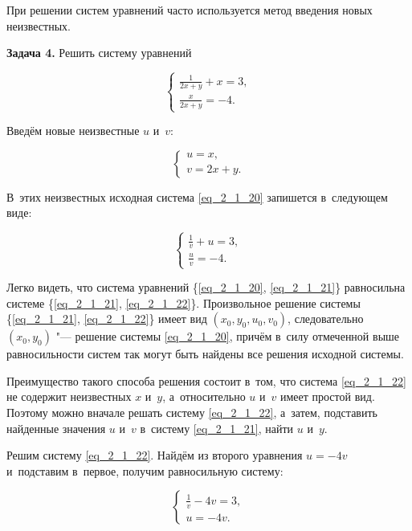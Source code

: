 При решении систем уравнений часто используется метод введения новых неизвестных.

\textbf{Задача 4.}
Решить систему уравнений

\begin{equation}\label{eq_2_1_20}
\begin{cases}
\displaystyle \frac{1}{2x + y} + x = 3, \\[10pt]
\displaystyle \frac{x}{2x + y} = -4.
\end{cases}
\end{equation} 

Введём новые неизвестные $u$ и~$v$:

\begin{equation}\label{eq_2_1_21}
\begin{cases}
u = x, \\
v = 2x + y.
\end{cases}
\end{equation}

В~этих неизвестных исходная система \eqref{eq_2_1_20} запишется в~следующем виде:

\begin{equation}\label{eq_2_1_22}
\begin{cases}
\displaystyle \frac{1}{v} + u = 3, \\[10pt]
\displaystyle \frac{u}{v} = -4.
\end{cases}
\end{equation}

Легко видеть, что система уравнений \{\eqref{eq_2_1_20}, \eqref{eq_2_1_21}\}
равносильна системе \{\eqref{eq_2_1_21}, \eqref{eq_2_1_22}\}.
Произвольное решение системы \{\eqref{eq_2_1_21}, \eqref{eq_2_1_22}\}
имеет вид $(x_{0}, y_{0}, u_{0}, v_{0})$, следовательно
$(x_{0}, y_{0})$ "--- решение системы \eqref{eq_2_1_20}, причём в~силу отмеченной
выше равносильности систем так могут быть найдены все решения исходной системы.

Преимущество такого способа решения состоит в~том, что система \eqref{eq_2_1_22}
не содержит неизвестных $x$ и~$y$, а~относительно $u$ и~$v$ имеет простой вид.
Поэтому можно вначале решать систему \eqref{eq_2_1_22}, а~затем, подставить
найденные значения $u$ и~$v$ в~систему \eqref{eq_2_1_21}, найти $u$ и~$y$.

Решим систему \eqref{eq_2_1_22}. Найдём из второго уравнения $u = -4v$
и~подставим в~первое, получим равносильную систему:

\begin{equation*}
\begin{cases}
\displaystyle \frac{1}{v} - 4v = 3, \\
u = -4v.
\end{cases}
\end{equation*}

